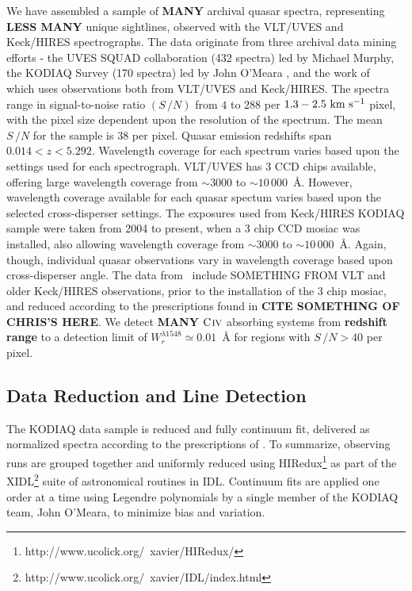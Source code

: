 \documentclass[linenumbers,twocolumn]{aastex61}
\begin{document}
We have assembled a sample of {\bf MANY} archival quasar spectra, representing {\bf LESS MANY} unique sightlines, observed with the VLT/UVES and Keck/HIRES spectrographs. The data originate from three archival data mining efforts - the UVES SQUAD collaboration (432 spectra) led by Michael Murphy, the KODIAQ Survey (170 spectra) led by John O'Meara \citep{OMeara2015}, and the work of~\cite{EvansThesis} which uses observations both from VLT/UVES and Keck/HIRES. The spectra range in signal-to-noise ratio $(S\,/N)$ from $4$ to $288$ per $1.3 - 2.5~\mathrm{\hbox{km~s$^{-1}$}}$ pixel, with the pixel size dependent upon the resolution of the spectrum. The mean $S\,/N$ for the sample is $38$ per pixel. Quasar emission redshifts span $0.014 < z < 5.292$. Wavelength coverage for each spectrum varies based upon the settings used for each spectrograph. VLT/UVES has 3 CCD chips available, offering large wavelength coverage from $\sim 3000$ to $\sim10\,000$~{\AA}. However, wavelength coverage available for each quasar spectum varies based upon the selected cross-disperser settings. The exposures used from Keck/HIRES KODIAQ sample were taken from 2004 to present, when a 3 chip CCD mosiac was installed, also allowing wavelength coverage from  $\sim 3000$ to $\sim10\,000$~{\AA}. Again, though, individual quasar observations vary in wavelength coverage based upon cross-disperser angle. The data from~\cite{EvansThesis} include SOMETHING FROM VLT and older Keck/HIRES observations, prior to the installation of the 3 chip mosiac, and reduced according to the prescriptions found in {\bf CITE SOMETHING OF CHRIS'S HERE}. We detect {\bf MANY} ${\hbox{{\rm C}\kern 0.1em{\sc iv}}}$ absorbing systems from {\bf redshift range} to a detection limit of $W_r^{\lambda1548} \simeq 0.01$~{\AA} for regions with $S\,/N > 40$ per pixel.


\subsection{Data Reduction and Line Detection}
\label{sec:detection}

The KODIAQ data sample is reduced and fully continuum fit, delivered as normalized spectra according to the prescriptions of \cite{OMeara2015}. To summarize, observing runs are grouped together and uniformly reduced using HIRedux\footnote{http://www.ucolick.org/~xavier/HIRedux/} as part of the XIDL\footnote{http://www.ucolick.org/~xavier/IDL/index.html} suite of astronomical routines in IDL. Continuum fits are applied one order at a time using Legendre polynomials by a single member of the KODIAQ team, John O'Meara, to minimize bias and variation.
\end{document}
